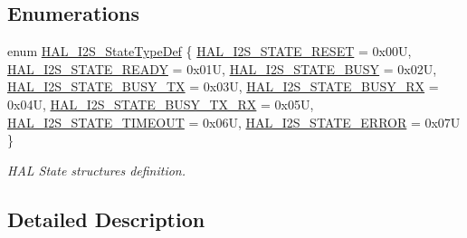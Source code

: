 \subsection*{Enumerations}
\begin{DoxyCompactItemize}
\item 
enum \hyperlink{group___i2_s___exported___types_ga2588a0c71baf7cd6d2c1b9b11120bef0}{H\+A\+L\+\_\+\+I2\+S\+\_\+\+State\+Type\+Def} \{ \newline
\hyperlink{group___i2_s___exported___types_gga2588a0c71baf7cd6d2c1b9b11120bef0a2b69279eb021ef38d711edcdc5c95054}{H\+A\+L\+\_\+\+I2\+S\+\_\+\+S\+T\+A\+T\+E\+\_\+\+R\+E\+S\+ET} = 0x00U, 
\hyperlink{group___i2_s___exported___types_gga2588a0c71baf7cd6d2c1b9b11120bef0afb3efb92ef3bcfce6f4d34570b31a602}{H\+A\+L\+\_\+\+I2\+S\+\_\+\+S\+T\+A\+T\+E\+\_\+\+R\+E\+A\+DY} = 0x01U, 
\hyperlink{group___i2_s___exported___types_gga2588a0c71baf7cd6d2c1b9b11120bef0a0d9faadcd5b6010c6071905345a282e7}{H\+A\+L\+\_\+\+I2\+S\+\_\+\+S\+T\+A\+T\+E\+\_\+\+B\+U\+SY} = 0x02U, 
\hyperlink{group___i2_s___exported___types_gga2588a0c71baf7cd6d2c1b9b11120bef0ab8386636ae24469508b8312e7bfbc4b3}{H\+A\+L\+\_\+\+I2\+S\+\_\+\+S\+T\+A\+T\+E\+\_\+\+B\+U\+S\+Y\+\_\+\+TX} = 0x03U, 
\newline
\hyperlink{group___i2_s___exported___types_gga2588a0c71baf7cd6d2c1b9b11120bef0a641d635762b2ebb2e8e16917efc13162}{H\+A\+L\+\_\+\+I2\+S\+\_\+\+S\+T\+A\+T\+E\+\_\+\+B\+U\+S\+Y\+\_\+\+RX} = 0x04U, 
\hyperlink{group___i2_s___exported___types_gga2588a0c71baf7cd6d2c1b9b11120bef0a4135585ed147654154c0b7be15f3807e}{H\+A\+L\+\_\+\+I2\+S\+\_\+\+S\+T\+A\+T\+E\+\_\+\+B\+U\+S\+Y\+\_\+\+T\+X\+\_\+\+RX} = 0x05U, 
\hyperlink{group___i2_s___exported___types_gga2588a0c71baf7cd6d2c1b9b11120bef0a95d3eabfe7ff5d52af473e7fc96f9536}{H\+A\+L\+\_\+\+I2\+S\+\_\+\+S\+T\+A\+T\+E\+\_\+\+T\+I\+M\+E\+O\+UT} = 0x06U, 
\hyperlink{group___i2_s___exported___types_gga2588a0c71baf7cd6d2c1b9b11120bef0a011e8568b5b81c7074f2cbfa38b8a2d8}{H\+A\+L\+\_\+\+I2\+S\+\_\+\+S\+T\+A\+T\+E\+\_\+\+E\+R\+R\+OR} = 0x07U
 \}\begin{DoxyCompactList}\small\item\em H\+AL State structures definition. \end{DoxyCompactList}
\end{DoxyCompactItemize}


\subsection{Detailed Description}


